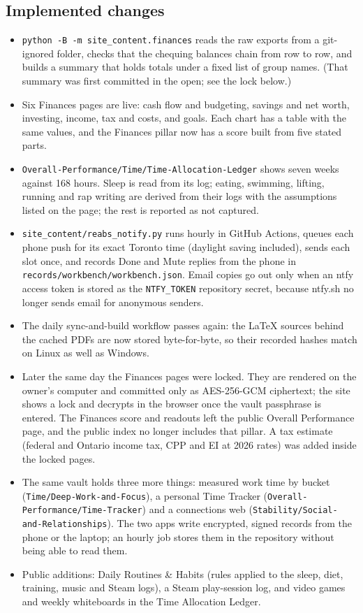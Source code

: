 \documentclass[11pt]{article}
\begin{document}
\subsection{Implemented changes}
\begin{itemize}
\item \texttt{python -B -m site\_content.finances} reads the raw exports from a git-ignored folder, checks that the chequing balances chain from row to row, and builds a summary that holds totals under a fixed list of group names. (That summary was first committed in the open; see the lock below.)
\item Six Finances pages are live: cash flow and budgeting, savings and net worth, investing, income, tax and costs, and goals. Each chart has a table with the same values, and the Finances pillar now has a score built from five stated parts.
\item \texttt{Overall-Performance/Time/Time-Allocation-Ledger} shows seven weeks against 168 hours. Sleep is read from its log; eating, swimming, lifting, running and rap writing are derived from their logs with the assumptions listed on the page; the rest is reported as not captured.
\item \texttt{site\_content/reabs\_notify.py} runs hourly in GitHub Actions, queues each phone push for its exact Toronto time (daylight saving included), sends each slot once, and records Done and Mute replies from the phone in \texttt{records/workbench/workbench.json}. Email copies go out only when an ntfy access token is stored as the \texttt{NTFY\_TOKEN} repository secret, because ntfy.sh no longer sends email for anonymous senders.
\item The daily sync-and-build workflow passes again: the LaTeX sources behind the cached PDFs are now stored byte-for-byte, so their recorded hashes match on Linux as well as Windows.
\item Later the same day the Finances pages were locked. They are rendered on the owner's computer and committed only as AES-256-GCM ciphertext; the site shows a lock and decrypts in the browser once the vault passphrase is entered. The Finances score and readouts left the public Overall Performance page, and the public index no longer includes that pillar. A tax estimate (federal and Ontario income tax, CPP and EI at 2026 rates) was added inside the locked pages.
\item The same vault holds three more things: measured work time by bucket (\texttt{Time/Deep-Work-and-Focus}), a personal Time Tracker (\texttt{Overall-Performance/Time-Tracker}) and a connections web (\texttt{Stability/Social-and-Relationships}). The two apps write encrypted, signed records from the phone or the laptop; an hourly job stores them in the repository without being able to read them.
\item Public additions: Daily Routines \& Habits (rules applied to the sleep, diet, training, music and Steam logs), a Steam play-session log, and video games and weekly whiteboards in the Time Allocation Ledger.
\end{itemize}
\end{document}
